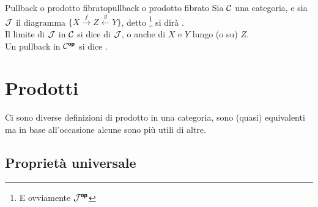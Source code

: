 \documentclass{article}
\renewcommand\C{\mc{C}}
\newcommand\J{\mc{J}}
\begin{document}
\begin{definition}{Pullback o prodotto fibrato}{pullback o prodotto fibrato}
    Sia $\C$ una categoria, e sia $\J$ il diagramma $\{ X\xrightarrow{f} Z \xleftarrow{g} Y \}$, detto \footnote{E ovviamente $\J^\op$} si dirà .\\
    Il limite di $\J$ in $\C$ si dice  di $\J$, o anche  di $X$ e $Y$ lungo (o su) $Z$.\\
    Un pullback in $\C^\op$ si dice .
\end{definition}

\pagebreak 

\section{Prodotti}

Ci sono diverse definizioni di prodotto in una categoria, sono (quasi) equivalenti ma in base all'occasione alcune sono più utili di altre.

\subsection{Proprietà universale}
\end{document}
